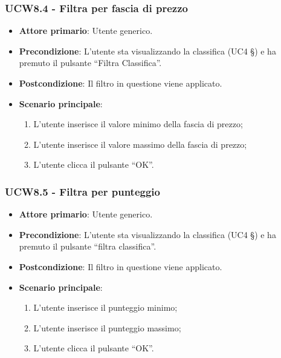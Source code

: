 \subsubsection{UCW8.4 - Filtra per fascia di prezzo}
\begin{itemize}
    \item \textbf{Attore primario}: Utente generico.
    \item \textbf{Precondizione}: L’utente sta visualizzando la classifica (UC4 §) e ha premuto il pulsante “Filtra Classifica”.
    \item \textbf{Postcondizione}: Il filtro in questione viene applicato.
    \item \textbf{Scenario principale}: 
    \begin{enumerate}
        \item L’utente inserisce il valore minimo della fascia di prezzo;
        \item L’utente inserisce il valore massimo della fascia di prezzo;
        \item L’utente clicca il pulsante “OK”.
    \end{enumerate}
\end{itemize}

\subsubsection{UCW8.5 - Filtra per punteggio}
\begin{itemize}
    \item \textbf{Attore primario}: Utente generico.
    \item \textbf{Precondizione}: L’utente sta visualizzando la classifica (UC4 §) e ha premuto il pulsante “filtra classifica”.
    \item \textbf{Postcondizione}: Il filtro in questione viene applicato.
    \item \textbf{Scenario principale}: 
    \begin{enumerate}
        \item L’utente inserisce il punteggio minimo;
        \item L’utente inserisce il punteggio massimo;
        \item L’utente clicca il pulsante “OK”.
    \end{enumerate}
\end{itemize}


